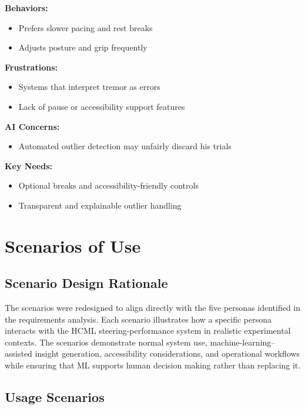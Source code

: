 \documentclass[sigconf]{acmart}
\begin{document}
\textbf{Behaviors:}
\begin{itemize}
    \item Prefers slower pacing and rest breaks
    \item Adjusts posture and grip frequently
\end{itemize}

\textbf{Frustrations:}
\begin{itemize}
    \item Systems that interpret tremor as errors
    \item Lack of pause or accessibility support features
\end{itemize}

\textbf{AI Concerns:}
\begin{itemize}
    \item Automated outlier detection may unfairly discard his trials
\end{itemize}

\textbf{Key Needs:}
\begin{itemize}
    \item Optional breaks and accessibility-friendly controls
    \item Transparent and explainable outlier handling
\end{itemize}


\section{Scenarios of Use}

\subsection{Scenario Design Rationale}

The scenarios were redesigned to align directly with the five personas identified in the requirements analysis. Each scenario illustrates how a specific persona interacts with the HCML steering-performance system in realistic experimental contexts. The scenarios demonstrate normal system use, machine-learning–assisted insight generation, accessibility considerations, and operational workflows while ensuring that ML supports human decision making rather than replacing it.

\subsection{Usage Scenarios}
\end{document}
